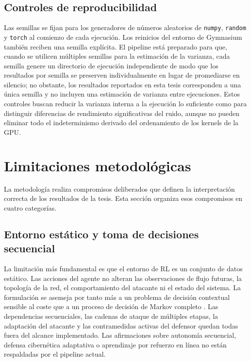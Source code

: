 \subsection{Controles de reproducibilidad}
Las semillas se fijan para los generadores de números aleatorios de \texttt{numpy}, \texttt{random} y \texttt{torch} al comienzo de cada ejecución. Los reinicios del entorno de Gymnasium también reciben una semilla explícita. El pipeline está preparado para que, cuando se utilicen múltiples semillas para la estimación de la varianza, cada semilla genere un directorio de ejecución independiente de modo que los resultados por semilla se preserven individualmente en lugar de promediarse en silencio; no obstante, los resultados reportados en esta tesis corresponden a una única semilla y no incluyen una estimación de varianza entre ejecuciones. Estos controles buscan reducir la varianza interna a la ejecución lo suficiente como para distinguir diferencias de rendimiento significativas del ruido, aunque no pueden eliminar todo el indeterminismo derivado del ordenamiento de los kernels de la GPU.

\section{Limitaciones metodológicas}
La metodología realiza compromisos deliberados que definen la interpretación correcta de los resultados de la tesis. Esta sección organiza esos compromisos en cuatro categorías.

\subsection{Entorno estático y toma de decisiones secuencial}
La limitación más fundamental es que el entorno de RL es un conjunto de datos estático. Las acciones del agente no alteran las observaciones de flujo futuras, la topología de la red, el comportamiento del atacante ni el estado del sistema. La formulación se asemeja por tanto más a un problema de decisión contextual sensible al coste que a un proceso de decisión de Markov completo \parencite{SuttonBarto2018RL,Levine2020OfflineRL}. Las dependencias secuenciales, las cadenas de ataque de múltiples etapas, la adaptación del atacante y las contramedidas activas del defensor quedan todas fuera del alcance implementado. Las afirmaciones sobre autonomía secuencial, defensa cibernética adaptativa o aprendizaje por refuerzo en línea no están respaldadas por el pipeline actual.

